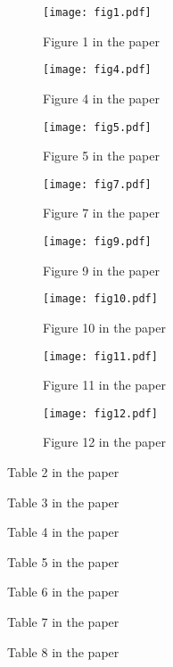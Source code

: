 \documentclass{article}
\begin{document}
\begin{figure}[h!tb]
	\texttt{[image: fig1.pdf]}
	\caption{Figure 1 in the paper}
\end{figure}

\begin{figure}[h!tb]
	\texttt{[image: fig4.pdf]}
	\caption{Figure 4 in the paper}
\end{figure}

\begin{figure}[h!tb]
	\texttt{[image: fig5.pdf]}
	\caption{Figure 5 in the paper}
\end{figure}

\begin{figure}[h!tb]
	\texttt{[image: fig7.pdf]}
	\caption{Figure 7 in the paper}
\end{figure}

\begin{figure}[h!tb]
	\texttt{[image: fig9.pdf]}
	\caption{Figure 9 in the paper}
\end{figure}

\begin{figure}[h!tb]
	\texttt{[image: fig10.pdf]}
	\caption{Figure 10 in the paper}
\end{figure}

\begin{figure}[h!tb]
	\texttt{[image: fig11.pdf]}
	\caption{Figure 11 in the paper}
\end{figure}

\begin{figure}[h!tb]
	\texttt{[image: fig12.pdf]}
	\caption{Figure 12 in the paper}
\end{figure}

\clearpage
\begin{table*}
\caption{Table 2 in the paper}
\scriptsize
\end{table*}

\begin{table*}
	\caption{Table 3 in the paper}
\scriptsize
\end{table*}

\begin{table*}
	\caption{Table 4 in the paper}
	\scriptsize
\end{table*}

\begin{table*}
	\caption{Table 5 in the paper}
	\scriptsize
\end{table*}

\begin{table*}
	\caption{Table 6 in the paper}
	\scriptsize
\end{table*}

\begin{table*}
	\caption{Table 7 in the paper}
	\scriptsize
\end{table*}

\begin{table*}
	\caption{Table 8 in the paper}
	\scriptsize
\end{table*}
\end{document}
